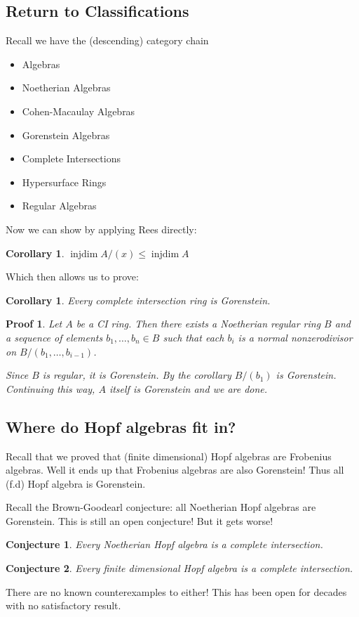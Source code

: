 \documentclass[12pt]{article}
\theoremstyle{break}
\theoremstyle{nonumberbreak}
\theoremstyle{changebreak}
\newtheorem{cor}[thm]{Corollary}
\theoremstyle{break}
\theoremstyle{nonumberbreak}
\newtheorem{prf}{Proof}
\theoremstyle{nonumberplain}
\newtheorem{conj}{Conjecture}
\theoremstyle{change}
\DeclareMathOperator{\injdim}{injdim}
\begin{document}
\subsection{Return to Classifications}
Recall we have the (descending) category chain
\begin{itemize}
	\item Algebras
	\item Noetherian Algebras
	\item Cohen-Macaulay Algebras
	\item Gorenstein Algebras
	\item Complete Intersections
	\item Hypersurface Rings
	\item Regular Algebras
\end{itemize}
Now we can show by applying Rees directly:
\begin{cor}
	$\injdim A/(x)\le \injdim A$
\end{cor}
Which then allows us to prove:
\begin{cor}
	Every complete intersection ring is Gorenstein.
\end{cor}
\begin{prf}
	Let $A$ be a CI ring. Then there exists a Noetherian regular ring $B$ and a sequence of elements $b_1,\dots, b_n\in B$ 
	such that each $b_i$ is a normal nonzerodivisor on $B/(b_1,\dots,b_{i-1})$.

	Since $B$ is regular, it is Gorenstein. By the corollary $B/(b_1)$ is Gorenstein. Continuing this way, $A$
	itself is Gorenstein and we are done. 
\end{prf}

\subsection{Where do Hopf algebras fit in?}
Recall that we proved that (finite dimensional) Hopf algebras are Frobenius algebras. Well it ends up
that Frobenius algebras are also Gorenstein! Thus all (f.d) Hopf algebra is Gorenstein.

Recall the Brown-Goodearl conjecture: all Noetherian Hopf algebras are Gorenstein. This is still an open conjecture!
But it gets worse!
\begin{conj}
	Every Noetherian Hopf algebra is a complete intersection.
\end{conj}
\begin{conj}
	Every finite dimensional Hopf algebra is a complete intersection.
\end{conj}
There are no known counterexamples to either! This has been open for decades with no satisfactory result.
\end{document}
